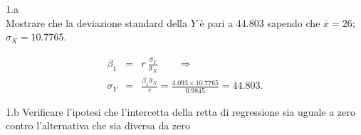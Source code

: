 \documentclass[
  11pt,
]{book}
\theoremstyle{mytheoremstyle}
\theoremstyle{mydefstyle}
\newenvironment{sol}
  {
  \begin{tcolorbox}[enhanced,breakable,arc=0.1mm,boxrule=1pt,colback=white,colframe=iblue,
  title=\bf \fontfamily{lmss}\selectfont \hspace{.5 cm} Soluzione,drop fuzzy shadow]

}{
\end{tcolorbox}
  }
\begin{document}
1.a\\
Mostrare che la deviazione standard della \(Y\) è pari a 44.803 sapendo che
\(\bar{x} = 26\); \(\widehat{\sigma}_{X} = 10.7765\).

\begin{sol}
\begin{eqnarray*}
\beta_{1}  &=& r\ \frac{\widehat{\sigma}_{Y}} {\widehat{\sigma}_{X}}
               \qquad\Rightarrow \\
\sigma_{Y} &=& \frac{\beta_{1} \widehat{\sigma}_{X}} {r}
            =  \frac{4.093 \times 10.7765} {0.9845}  = 44.803.
\end{eqnarray*}

\end{sol}

1.b
Verificare l'ipotesi che l'intercetta della retta di
regressione sia uguale a zero contro l'alternativa che sia
diversa da zero
\end{document}
